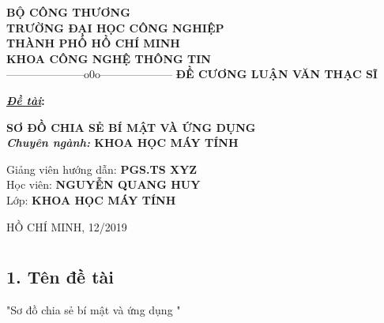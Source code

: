 \documentclass[12pt,a4paper]{report}
\begin{document}
\fontsize{13pt}{18pt}\selectfont
\setlength{\baselineskip}{18truept}
\begin{framed}

	\begin{center}
		{\large\bf BỘ CÔNG THƯƠNG}\\
		{\large\bf TRƯỜNG ĐẠI HỌC CÔNG NGHIỆP \\
			THÀNH PHỐ HỒ CHÍ MINH}\\
		{\large\bf KHOA CÔNG NGHỆ THÔNG TIN} \\
		{---------------------o0o--------------------}
		\vskip 4cm
		{\bf ĐỀ CƯƠNG LUẬN VĂN THẠC SĨ}\\[1cm]
		\begin{flushleft}
			{\bf {\underline{\textit{Đề tài}}:}}
		\end{flushleft}
		
		{\Large\bf \textbf{SƠ ĐỒ CHIA SẺ BÍ MẬT VÀ ỨNG DỤNG}}\\
		\vskip 1cm
		{\bf {\it Chuyên ngành:} KHOA HỌC MÁY TÍNH}
		\vskip 5cm
		\begin{flushleft}
			Giảng viên hướng dẫn: \textbf{PGS.TS XYZ}\\[0.5cm]
			Học viên: \textbf{NGUYỄN QUANG HUY}\\[0.5cm]
			Lớp: \textbf{KHOA HỌC MÁY TÍNH} \\[0.5cm]
		\end{flushleft}		
	 HỒ CHÍ MINH, 12/2019

	\end{center}
\end{framed}

\chapter*{}
\section*{1. Tên đề tài}
		"Sơ đồ chia sẻ bí mật và ứng dụng "
\end{document}
